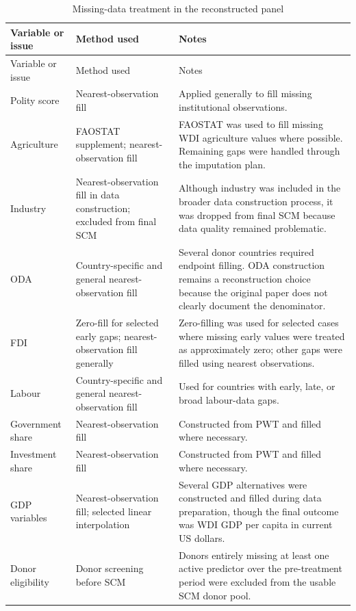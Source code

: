 \documentclass[a4paper]{article}
\begin{document}
\begin{longtable}{p{4cm}p{4cm}p{7cm}}
\caption{Missing-data treatment in the reconstructed panel}
\label{tab:missing_data_treatment} \\
\toprule
Variable or issue & Method used & Notes \\
\midrule
\endfirsthead

\toprule
Variable or issue & Method used & Notes \\
\midrule
\endhead

Polity score & Nearest-observation fill & Applied generally to fill missing institutional observations. \\

Agriculture & FAOSTAT supplement; nearest-observation fill & FAOSTAT was used to fill missing WDI agriculture values where possible. Remaining gaps were handled through the imputation plan. \\

Industry & Nearest-observation fill in data construction; excluded from final SCM & Although industry was included in the broader data construction process, it was dropped from final SCM because data quality remained problematic. \\

ODA & Country-specific and general nearest-observation fill & Several donor countries required endpoint filling. ODA construction remains a reconstruction choice because the original paper does not clearly document the denominator. \\

FDI & Zero-fill for selected early gaps; nearest-observation fill generally & Zero-filling was used for selected cases where missing early values were treated as approximately zero; other gaps were filled using nearest observations. \\

Labour & Country-specific and general nearest-observation fill & Used for countries with early, late, or broad labour-data gaps. \\

Government share & Nearest-observation fill & Constructed from PWT and filled where necessary. \\

Investment share & Nearest-observation fill & Constructed from PWT and filled where necessary. \\

GDP variables & Nearest-observation fill; selected linear interpolation & Several GDP alternatives were constructed and filled during data preparation, though the final outcome was WDI GDP per capita in current US dollars. \\

Donor eligibility & Donor screening before SCM & Donors entirely missing at least one active predictor over the pre-treatment period were excluded from the usable SCM donor pool. \\
\bottomrule
\end{longtable}
\end{document}
